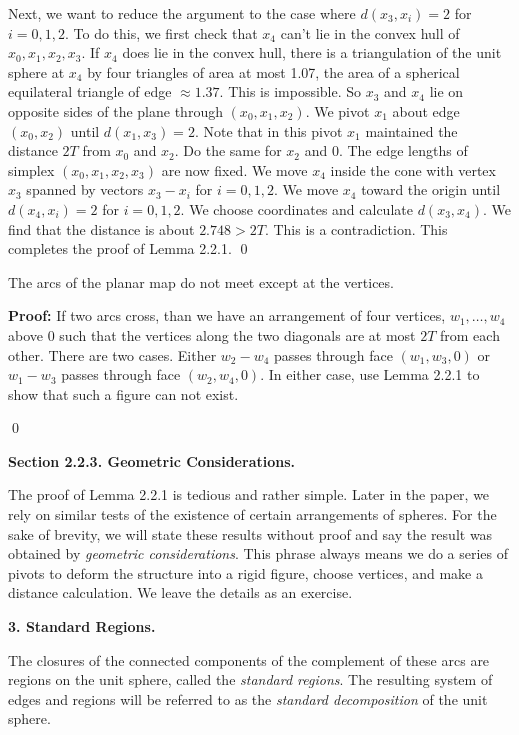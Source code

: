 Next, we want to reduce the argument to the case where 
$d(x_3,x_i)=2$ for $i=0,1,2$.  To do this, we first check that 
$x_4$ can't lie in the convex hull of $x_0,x_1,x_2,x_3$.  If $x_4$ does lie 
in the convex hull, there is a triangulation of the unit sphere at $x_4$ 
by four triangles of area at most 1.07, the area of a spherical
equilateral triangle 
of edge $\approx 1.37$.   This is impossible.  So $x_3$ and $x_4$ lie on opposite sides 
of the plane through $(x_0,x_1,x_2)$.  We pivot $x_1$ about edge $(x_0,x_2)$ until 
$d(x_1,x_3)=2$.  Note that in this pivot $x_1$ maintained the distance $2T$ 
from $x_0$ and $x_2$.  Do the same for $x_2$ and $0$.  The edge lengths of 
simplex $(x_0,x_1,x_2,x_3)$ are now fixed.  We move $x_4$ inside the cone 
with vertex $x_3$ spanned by vectors $x_3-x_i$ for $i=0,1,2$.  
We move $x_4$ toward the origin until $d(x_4,x_i)=2$ for $i=0,1,2$.  We choose coordinates
and calculate $d(x_3,x_4)$.  We find that the distance is about $2.748 > 2T$.
This is a contradiction.  This completes the proof of Lemma 2.2.1. \qed

 The arcs of the planar map do not meet except at the vertices.  \endproclaim

{\bf Proof:} If two arcs cross, than we have an arrangement of four vertices, 
$w_1,\dots,w_4$
 above $0$ such that the vertices along the two diagonals are at most $2T$ from each other.
There are two cases.  Either $w_2-w_4$ passes through face $(w_1,w_3,0)$ or $w_1-w_3$ 
passes through face $(w_2,w_4,0)$.  In either case, use Lemma 2.2.1 to show that such a figure 
can not exist.  

\qed


\bigskip

{\bf Section 2.2.3. Geometric Considerations.}

\bigskip
The proof of Lemma 2.2.1 is tedious and rather simple.  Later in the paper, we rely on similar tests of the existence of certain arrangements of spheres.  For the sake of brevity, we will state these results without proof and say the result was obtained by {\it geometric considerations}.  This phrase always means we do a series of pivots to deform the structure into a rigid figure, choose vertices, and make a distance calculation.  We leave the details as an exercise.


\bigskip

\centerline{ { \bf 3. Standard Regions.}}

\bigskip

The closures of the connected components of the complement of these arcs are regions 
on the unit sphere, called the {\it standard regions}. 
 The resulting system of edges and regions will be 
referred to as the {\it standard decomposition} of the unit sphere.



